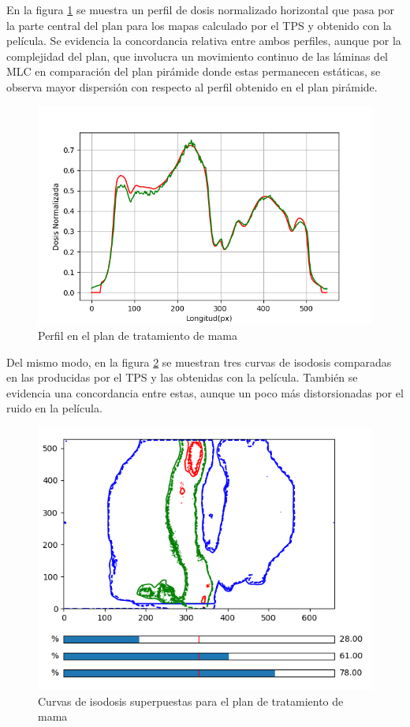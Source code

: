 En la figura \ref{fig:mamaPerfil} se muestra un perfil de dosis normalizado horizontal que pasa por la parte central del plan para los mapas calculado por el TPS y obtenido con la película. Se evidencia la concordancia relativa entre ambos perfiles, aunque por la complejidad del plan, que involucra un movimiento continuo de las láminas del MLC en comparación del plan pirámide donde estas permanecen estáticas, se observa mayor dispersión con respecto al perfil obtenido en el plan pirámide.\\

\begin{figure}[H]
	\centering
	\includegraphics[width=0.7\linewidth]{images/perfilDosisMama.png}
	\caption{Perfil en el plan de tratamiento de mama }
	\label{fig:mamaPerfil}
\end{figure}

Del mismo modo, en la figura \ref{fig:mamaIsodosis} se muestran tres curvas de isodosis comparadas en las producidas por el TPS y las obtenidas con la película. También se evidencia una concordancia entre estas, aunque un poco más distorsionadas por el ruido en la película.

\begin{figure}[H]
	\centering
	\includegraphics[width=0.7\linewidth]{images/curvasIsodosisMama.png}
	\caption{Curvas de isodosis superpuestas para el plan de tratamiento de mama }
	\label{fig:mamaIsodosis}
\end{figure}


